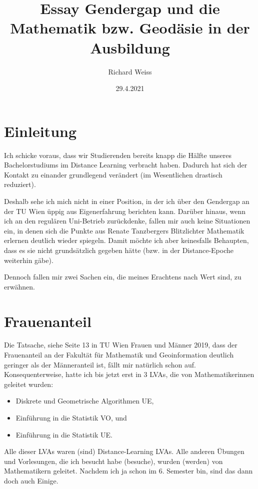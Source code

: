 \documentclass{article}
\title{Essay Gendergap und die Mathematik bzw. Geodäsie in der Ausbildung}
\author{Richard Weiss}
\date{29.4.2021}
\newcommand{\Quote}[1]{\glqq #1\grqq{}}
\begin{document}
\maketitle

\section*{Einleitung}

Ich schicke voraus, dass wir Studierenden bereits knapp die Hälfte unseres Bachelorstudiums im Distance Learning verbracht haben.
Dadurch hat sich der Kontakt zu einander grundlegend verändert (im Wesentlichen drastisch reduziert).

Deshalb sehe ich mich nicht in einer Position, in der ich über den Gendergap an der TU Wien üppig aus Eigenerfahrung berichten kann.
Darüber hinaus, wenn ich an den regulären Uni-Betrieb zurückdenke, fallen mir auch keine Situationen ein, in denen sich die Punkte aus \Quote{Renate Tanzbergers Blitzlichter Mathematik erlernen} deutlich wieder spiegeln.
Damit möchte ich aber keinesfalls Behaupten, dass es sie nicht grundsätzlich gegeben hätte (bzw. in der \Quote{Distance-Epoche} weiterhin gäbe).

Dennoch fallen mir zwei Sachen ein, die meines Erachtens nach Wert sind, zu erwähnen.

\section*{Frauenanteil}

Die Tatsache, siehe Seite 13 in \Quote{TU Wien Frauen und Männer 2019}, dass der Frauenanteil an der Fakultät für Mathematik und Geoinformation deutlich geringer als der Männeranteil ist, fällt mir natürlich schon auf.
Konsequenterweise, hatte ich bis jetzt erst in 3 LVAs, die von Mathematikerinnen geleitet wurden:

\begin{itemize}
	\item \Quote{Diskrete und Geometrische Algorithmen UE},
	\item \Quote{Einführung in die Statistik VO}, und
	\item \Quote{Einführung in die Statistik UE}.
\end{itemize}


Alle dieser LVAs waren (sind) Distance-Learning LVAs.
Alle anderen Übungen und Vorlesungen, die ich besucht habe (besuche), wurden (werden) von Mathematikern geleitet.
Nachdem ich ja schon im 6. Semester bin, sind das dann doch auch Einige.
\end{document}
